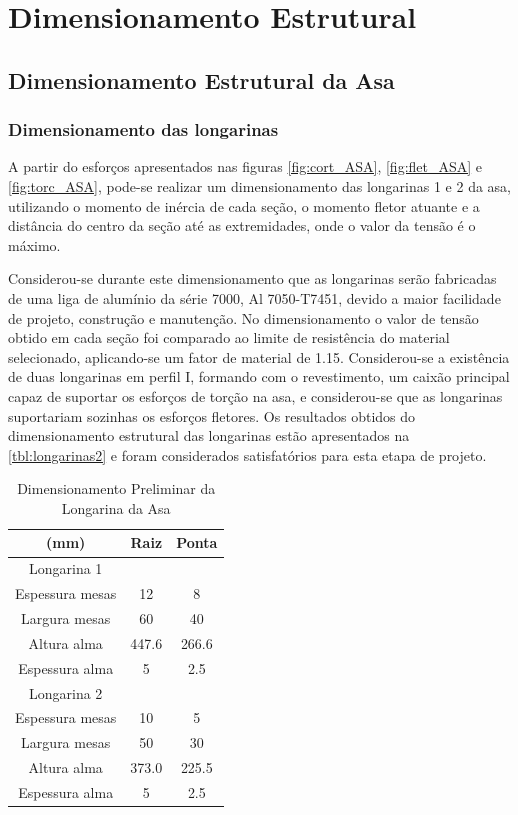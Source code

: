 \chapter{Dimensionamento Estrutural}

\section{Dimensionamento Estrutural da Asa}

\subsection{Dimensionamento das longarinas}
A partir do esforços apresentados nas figuras \ref{fig:cort_ASA}, \ref{fig:flet_ASA} e \ref{fig:torc_ASA}, pode-se realizar um dimensionamento das longarinas 1 e 2 da asa, utilizando o momento de inércia de cada seção, o momento fletor atuante e a distância do centro da seção até as extremidades, onde o valor da tensão é o máximo.

Considerou-se durante este dimensionamento que as longarinas serão fabricadas de uma liga de alumínio da série 7000, Al 7050-T7451, devido a maior facilidade de projeto, construção e manutenção. No dimensionamento o valor de tensão obtido em cada seção foi comparado ao limite de resistência do material selecionado, aplicando-se um fator de material de 1.15.
Considerou-se a existência de duas longarinas em perfil I, formando com o revestimento, um caixão principal capaz de suportar os esforços de torção na asa, e considerou-se que as longarinas suportariam sozinhas os esforços fletores.
Os resultados obtidos do dimensionamento estrutural das longarinas estão apresentados na \autoref{tbl:longarinas2} e foram considerados satisfatórios para esta etapa de projeto.


\begin{table}[H]
\centering
\begin{tabular}{ccc}
\toprule
(mm) & Raiz & Ponta \\ \midrule
Longarina 1 &  &   \\ \midrule
Espessura mesas & 12 & 8 \\
Largura mesas & 60 & 40\\
Altura alma & 447.6 & 266.6 \\
Espessura alma & 5 & 2.5 \\ \midrule
Longarina 2 &  &   \\ \midrule
Espessura mesas & 10 & 5 \\
Largura mesas & 50 & 30 \\
Altura alma & 373.0 & 225.5 \\
Espessura alma & 5 & 2.5 \\
\bottomrule
\end{tabular}
\caption{Dimensionamento Preliminar da Longarina da Asa}
\label{tbl:longarinas2}
\end{table}

